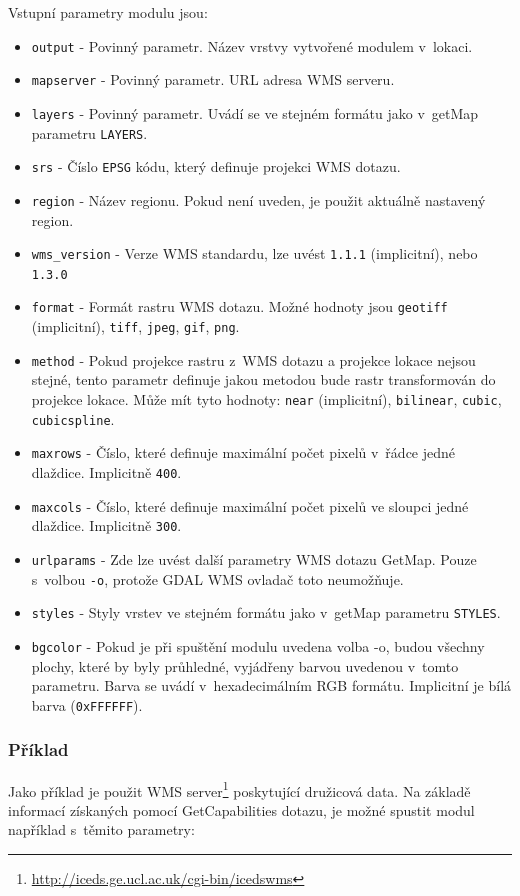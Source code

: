 \documentclass[a4paper,12pt]{article}
\begin{document}
\newpage
Vstupní parametry modulu jsou:
\begin{itemize}
  \item {\tt output} - Povinný parametr. Název vrstvy vytvořené modulem
v~lokaci.
  \item {\tt mapserver} - Povinný parametr. URL adresa WMS serveru.
  \item {\tt layers} - Povinný parametr. Uvádí se ve stejném formátu jako
v~getMap parametru {\tt LAYERS}.
 \item {\tt srs} - Číslo {\tt EPSG} kódu, který definuje projekci WMS dotazu.
 \item {\tt region} - Název regionu. Pokud není uveden, je použit aktuálně
   nastavený region.
 \item {\tt wms\_version} - Verze WMS standardu, lze uvést
   {\tt 1.1.1} (implicitní), nebo {\tt 1.3.0}
 \item {\tt format} - Formát rastru WMS dotazu. Možné hodnoty jsou {\tt geotiff}
   (implicitní), {\tt tiff}, {\tt jpeg}, {\tt gif}, {\tt png}.
 \item {\tt method} - Pokud projekce rastru z~WMS dotazu a projekce lokace
   nejsou stejné, tento parametr definuje jakou metodou bude rastr
   transformován do projekce lokace. Může mít tyto hodnoty: {\tt near}
   (implicitní), {\tt bilinear}, {\tt cubic}, {\tt cubicspline}.
 \item {\tt maxrows} - Číslo, které definuje maximální počet pixelů v~řádce
   jedné dlaždice. Implicitně {\tt 400}.
 \item {\tt maxcols} - Číslo, které definuje maximální počet pixelů ve
   sloupci jedné dlaždice. Implicitně {\tt 300}.
 \item {\tt urlparams} - Zde lze uvést další parametry WMS dotazu GetMap.
                   Pouze s~volbou {\tt -o}, protože GDAL WMS ovladač toto
                   neumožňuje.
 \item {\tt styles} - Styly vrstev ve stejném formátu jako v~getMap
   parametru {\tt STYLES}.
 \item {\tt bgcolor} - Pokud je při spuštění modulu uvedena volba -o,
   budou všechny plochy,
   které by byly průhledné, vyjádřeny barvou uvedenou v~tomto
   parametru. Barva se uvádí v~hexadecimálním RGB formátu. Implicitní
   je bílá barva ({\tt 0xFFFFFF}).
\end{itemize}

\subsubsection{Příklad}
Jako příklad je použit WMS
server\footnote{\url{http://iceds.ge.ucl.ac.uk/cgi-bin/icedswms}}
poskytující družicová data. Na základě informací získaných pomocí
GetCapabilities dotazu, je možné spustit modul například s~těmito
parametry:
\end{document}
